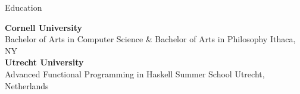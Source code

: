 
\begin{rSection}{Education}

	{\bf \large{Cornell University}} \hfill \color{darkgray}{08/2021 - 05/2025}
	\\ 
	Bachelor of Arts in Computer Science \& Bachelor of Arts in Philosophy \hfill Ithaca, NY \\
	\color{black}
	\footnotesize{\bf Utrecht University} \hfill {}
	\\ 
	\footnotesize{Advanced Functional Programming in Haskell Summer School} \hfill {\footnotesize{\color{black}Utrecht, Netherlands}}

	\color{black}

\end{rSection}